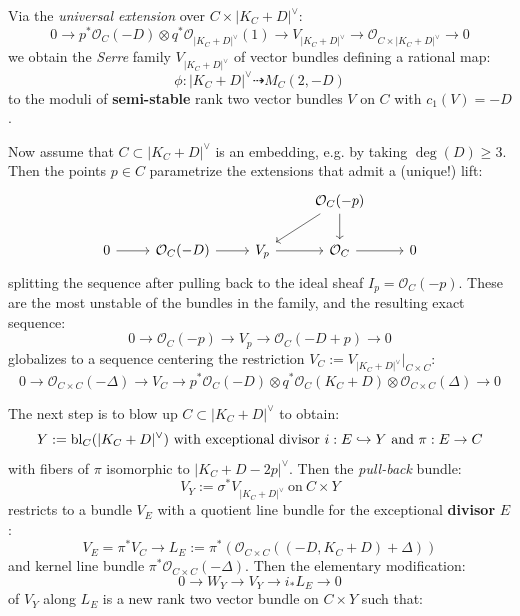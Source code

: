 \documentclass{amsart}
\begin{document}
Via the {\it universal extension} over $C \times |K_C + D|^\vee$:
\[ 0 \rightarrow p^* {\mathcal O}_C(-D) \otimes q^*{\mathcal O}_{|K_C + D|^\vee}(1) \rightarrow V_{|K_C + D|^\vee} \rightarrow {\mathcal O}_{C\times |K_C + D|^\vee} 
\rightarrow 0 \] 
we obtain the {\it Serre} family 
$V_{|K_C + D|^\vee}$ of vector bundles
defining a rational map:
\[ \phi: |K_C + D|^\vee \dashrightarrow M_C(2, -D) \] 
to the moduli of {\bf semi-stable} rank two vector bundles $V$ on $C$ with $c_1(V) = -D$. 

\medskip

Now assume that
$C \subset |K_C + D|^\vee$ is an embedding, e.g. by taking $\deg(D) \ge 3$.
Then the points $p \in C$ parametrize the extensions that admit a (unique!) lift: 
\[ \begin{tikzcd}
    &&& {\mathcal O}_C(-p) \arrow[dl] \arrow[d] \\
    0 \arrow[r] & {\mathcal O}_C(-D) \arrow[r] & V_p \arrow[r] & {\mathcal O}_C \arrow[r] & 0
\end{tikzcd} \]
splitting the sequence after pulling back to the ideal sheaf $I_p = {\mathcal O}_C(-p)$. These are the most unstable of the bundles in the family, 
and the resulting exact sequence:
\[ 0 \rightarrow {\mathcal O}_C(-p) \rightarrow V_p \rightarrow {\mathcal O}_C(-D + p) \rightarrow 0 \] 
globalizes to a sequence centering the restriction $V_C := V_{|K_C + D|^\vee}|_{C \times C}$: 
\[ 0 \rightarrow {\mathcal O}_{C \times C}(-\Delta) \rightarrow V_C \rightarrow 
p^*{\mathcal O}_C(-D) \otimes q^* {\mathcal O}_C(K_C + D) \otimes {\mathcal O}_{C\times C}(\Delta) \rightarrow 0 \]  

The next step is to blow up $C \subset |K_C + D|^\vee$ to obtain: 
\[ Y := \bl_C(|K_C + D|^\vee) \ \mbox{with exceptional divisor} \ i:E \hookrightarrow Y \ \mbox{and} \ \pi:E \rightarrow C \] 
with fibers of $\pi$ isomorphic to $|K_C + D - 2p|^\vee$. Then the {\it pull-back} bundle:
\[ V_Y := \sigma^*V_{|K_C + D|^\vee}  \ \mbox{on} \ C \times Y \]  
restricts to a bundle $V_E$ with a quotient line bundle for the exceptional  {\bf divisor} $E$: 
\[ V_E = \pi^*V_C  \rightarrow L_E := \pi^* \left( {\mathcal O}_{C \times C}( (-D, K_C + D) + \Delta) \right) \] 
and kernel line bundle $\pi^* {\mathcal O}_{C \times C}(-\Delta)$. Then the elementary modification: 
\[ 0 \rightarrow W_Y \rightarrow V_Y \rightarrow i_*L_E \rightarrow 0 \]  
of $V_Y$ along $L_E$ is a new rank two vector bundle on $C \times Y$ such that: 
\end{document}
